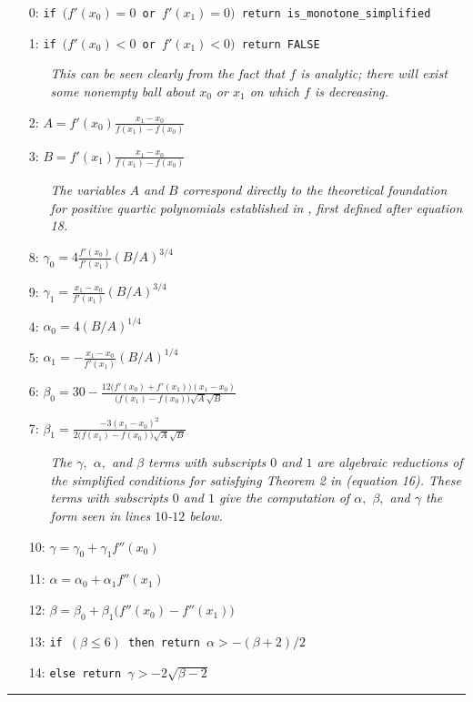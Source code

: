 \documentclass{article}
\begin{document}
\begin{itemize}
  \itemsep0pt
  \parskip0pt

\item[0:] \texttt{if $\big(f'(x_0) = 0$ or $f'(x_1) = 0\big)$ return is\_monotone\_simplified}
\item[1:] \texttt{if $\big(f'(x_0) < 0$ or $f'(x_1) < 0\big)$ return FALSE}
  \begin{itemize}
    \item[] \textit{This can be seen clearly from the fact that $f$ is analytic; there will exist some nonempty ball about $x_0$ or $x_1$ on which $f$ is decreasing.}
  \end{itemize}

\item[2:] $A = f'(x_0)\frac{x_1 - x_0}{f(x_1) - f(x_0)}$
\item[3:] $B = f'(x_1) \frac{x_1 - x_0}{f(x_1) - f(x_0)}$
  \begin{itemize}
    \item[] \textit{The variables $A$ and $B$ correspond directly to the theoretical foundation for positive quartic polynomials established in \cite{ulrich1994positivity}, first defined after equation 18.}
  \end{itemize}
\item[8:] $\gamma_0 = 4 \frac{f'(x_0)}{f'(x_1)} (B/A)^{3/4}$
\item[9:] $\gamma_1 = \frac{x_1 - x_0}{f'(x_1)} (B/A)^{3/4}$
\item[4:] $\alpha_0 = 4 (B/A)^{1/4}$
\item[5:] $\alpha_1 = -\frac{x_1 - x_0}{f'(x_1)} (B/A)^{1/4}$
\item[6:] $\beta_0 = 30 - \frac{12 \big(f'(x_0) + f'(x_1)\big) (x_1 - x_0)}{\big(f(x_1) - f(x_0)\big) \sqrt{A}\sqrt{B}}$
\item[7:] $\beta_1 = \frac{-3 (x_1 - x_0)^2}{2 \big(f(x_1) - f(x_0)\big) \sqrt{A} \sqrt{B}} $
  \begin{itemize}
    \item[] \textit{The $\gamma,$ $\alpha,$ and $\beta$ terms with subscripts $0$ and $1$ are algebraic reductions of the simplified conditions for satisfying Theorem 2 in \cite{ulrich1994positivity} (equation 16). These terms with subscripts $0$ and $1$ give the computation of $\alpha,$ $\beta,$ and $\gamma$ the form seen in lines $10$-$12$ below.}
  \end{itemize}
\item[10:] $\gamma = \gamma_0 + \gamma_1 f''(x_0)$
\item[11:] $\alpha = \alpha_0 + \alpha_1 f''(x_1)$
\item[12:] $\beta = \beta_0 + \beta_1 \big(f''(x_0) - f''(x_1)\big)$
\item[13:] \texttt{if $(\beta \leq 6)$ then return $\alpha > - (\beta + 2) / 2$}
\item[14:] \texttt{else return $\gamma > -2 \sqrt{\beta - 2}$ }

\end{itemize}
\hrule
\vspace{10pt}
\end{document}
